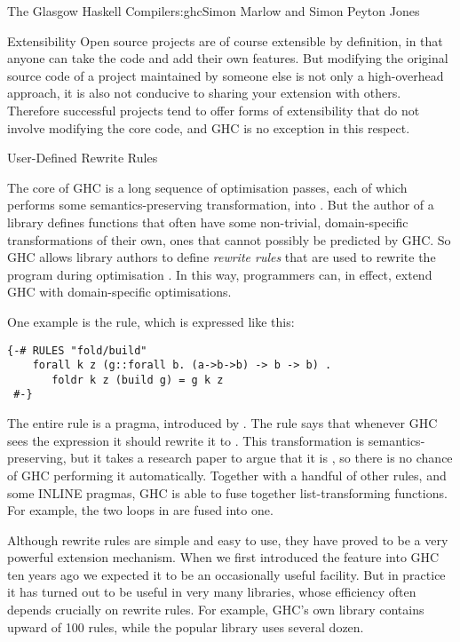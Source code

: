 \begin{aosachapter}{The Glasgow Haskell Compiler}{s:ghc}{Simon Marlow and Simon Peyton Jones}
\begin{aosasect1}{Extensibility}
Open source projects are of course extensible by definition, in that
anyone can take the code and add their own features.  But modifying
the original source code of a project maintained by someone else is
not only a high-overhead approach, it is also not conducive to sharing
your extension with others.  Therefore successful projects tend to
offer forms of extensibility that do not involve modifying the core
code, and GHC is no exception in this respect.

\begin{aosasect2}{User-Defined Rewrite Rules}
\label{s:rules}

The core of GHC is a long sequence of optimisation passes, each of
which performs some semantics-preserving transformation, 
into .  But the author of a library defines functions that
often have some non-trivial, domain-specific transformations of their
own, ones that cannot possibly be predicted by GHC. So GHC allows
library authors to define \emph{rewrite rules} that are used to
rewrite the program during optimisation
\cite{bib:playing-by-the-rules}.  In this way, programmers can,
in effect, extend GHC with domain-specific optimisations.

One example is the  rule, which is expressed like this:
\begin{verbatim}
{-# RULES "fold/build"    
    forall k z (g::forall b. (a->b->b) -> b -> b) . 
       foldr k z (build g) = g k z
 #-}
\end{verbatim}

The entire rule is a pragma, introduced by .  The rule
  says that whenever GHC sees the expression  it should rewrite it to .  This transformation
  is semantics-preserving, but it takes a research paper to argue that
  it is \cite{bib:gill-short-cut}, so there is no chance of GHC performing
  it automatically.  Together with a handful of other rules, and some
  INLINE pragmas, GHC is able to fuse together list-transforming
  functions.  For example, the two loops in 
  are fused into one.

Although rewrite rules are simple and easy to use, they have proved to
be a very powerful extension mechanism.  When we first introduced the
feature into GHC ten years ago we expected it to be an
occasionally useful facility.  But in practice it has turned out to be
useful in very many libraries, whose efficiency often depends
crucially on rewrite rules.  For example, GHC's own 
library contains upward of 100 rules, while the popular 
library uses several dozen.


\end{aosasect2}
\end{aosasect1}
\end{aosachapter}

